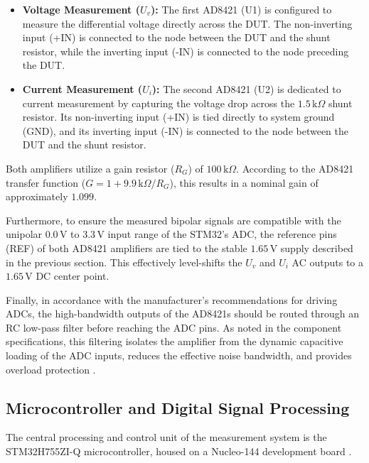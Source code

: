 \begin{itemize}
    \item \textbf{Voltage Measurement ($U_v$):} The first AD8421 (U1) is configured to measure the differential voltage directly across the DUT. The non-inverting input (+IN) is connected to the node between the DUT and the shunt resistor, while the inverting input (-IN) is connected to the node preceding the DUT. 
    \item \textbf{Current Measurement ($U_i$):} The second AD8421 (U2) is dedicated to current measurement by capturing the voltage drop across the $1.5\,\mathrm{k}\Omega$ shunt resistor. Its non-inverting input (+IN) is tied directly to system ground (GND), and its inverting input (-IN) is connected to the node between the DUT and the shunt resistor.
\end{itemize}

Both amplifiers utilize a gain resistor ($R_G$) of $100\,\mathrm{k}\Omega$. According to the AD8421 transfer function ($G = 1 + 9.9\,\mathrm{k}\Omega / R_G$), this results in a nominal gain of approximately $1.099$. 

Furthermore, to ensure the measured bipolar signals are compatible with the unipolar $0.0\,\mathrm{V}$ to $3.3\,\mathrm{V}$ input range of the STM32's ADC, the reference pins (REF) of both AD8421 amplifiers are tied to the stable $1.65\,\mathrm{V}$ supply described in the previous section. This effectively level-shifts the $U_v$ and $U_i$ AC outputs to a $1.65\,\mathrm{V}$ DC center point.

Finally, in accordance with the manufacturer's recommendations for driving ADCs, the high-bandwidth outputs of the AD8421s should be routed through an RC low-pass filter before reaching the ADC pins. As noted in the component specifications, this filtering isolates the amplifier from the dynamic capacitive loading of the ADC inputs, reduces the effective noise bandwidth, and provides overload protection \cite{ad8421_datasheet}.


\subsection{Microcontroller and Digital Signal Processing}
The central processing and control unit of the measurement system is the STM32H755ZI-Q microcontroller, housed on a Nucleo-144 development board \cite{stm32_nucleo}.

